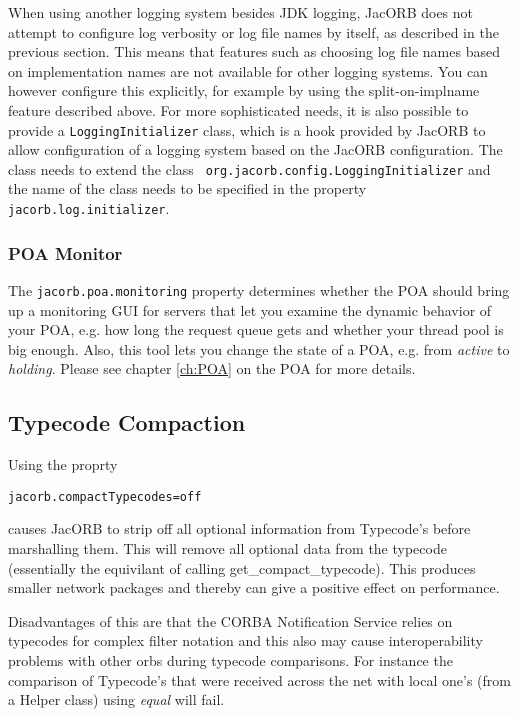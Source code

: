 When using another logging system besides JDK logging, JacORB does not
attempt to configure log verbosity or log file names by itself, as
described in the previous section.  This means that features such as
choosing log file names based on implementation names are not
available for other logging systems.  You can however configure this
explicitly, for example by using the split-on-implname feature
described above.  For more sophisticated needs, it is also possible to
provide a {\tt LoggingInitializer} class, which is a hook provided by
JacORB to allow configuration of a logging system based on the JacORB
configuration.  The class needs to extend the class {\tt
  org.jacorb.config.LoggingInitializer} and the name of the class
needs to be specified in the property {\tt jacorb.log.initializer}.

\subsubsection{POA Monitor}

The  {\tt jacorb.poa.monitoring} property  determines whether  the POA
should bring up a monitoring GUI  for servers that let you examine the
dynamic behavior of  your POA, e.g.  how long  the request queue gets
and whether your thread pool is  big enough.  Also, this tool lets you
change the  state of a POA,  e.g. from {\it active}  to {\it holding}.
Please see chapter \ref{ch:POA} on the POA for more details.


\subsection{Typecode Compaction}
\label{compact-typecode}
Using the proprty
\begin{verbatim}
jacorb.compactTypecodes=off
\end{verbatim}
causes JacORB to strip off all optional information from Typecode's before marshalling them.
This will remove all optional data from the typecode (essentially the equivilant of
calling get\_compact\_typecode). This produces smaller network packages and thereby can give a positive effect on performance.

Disadvantages of this are that the CORBA Notification Service relies on typecodes for complex
filter notation and this also may cause interoperability problems with other orbs during typecode
comparisons. For instance the comparison of Typecode's that were received across the net with
local one's (from a Helper class) using \emph{equal} will fail.

